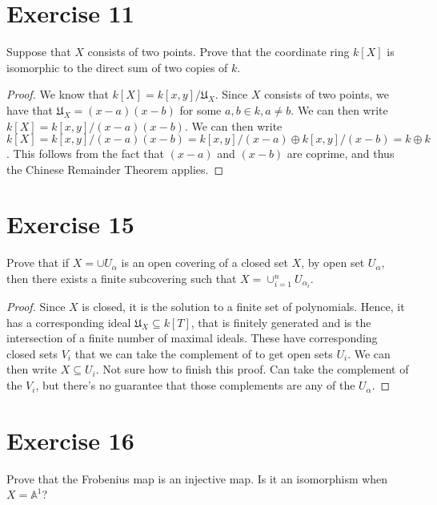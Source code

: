 \documentclass[12pt]{article}
\begin{document}
\section*{Exercise 11}

Suppose that $X$ consists of two points. Prove that the coordinate ring $k[X]$ is isomorphic to the
direct sum of two copies of $k$.

\begin{proof}

  We know that $k[X] = k[x,y] / \mathfrak{U}_X$. Since $X$ consists of two points, we have that
  $\mathfrak{U}_X = (x-a)(x-b)$ for some $a,b \in k, a \neq b$. We can then write $k[X] = k[x,y] / (x-a)(x-b)$.
  We can then write $k[X] = k[x,y] / (x-a)(x-b) = k[x,y] / (x-a) \oplus k[x,y] / (x-b) = k \oplus k$. 
  This follows from the fact that $(x-a)$ and $(x-b)$ are coprime, and thus the Chinese Remainder Theorem applies.

\end{proof}

\section*{Exercise 15}

Prove that if $X = \cup U_\alpha$ is an open covering of a closed set $X$, by open set $U_\alpha$,
then there exists a finite subcovering such that $X = \cup_{i=1}^{n} U_{\alpha_i}$.

\begin{proof}

  Since $X$ is closed, it is the solution to a finite set of polynomials. Hence, it has a
  corresponding ideal $\mathfrak{U}_X \subseteq k[T]$, that is finitely generated and is the
  intersection of a finite number of maximal ideals. These have corresponding closed sets $V_i$ that
  we can take the complement of to get open sets $U_i$. We can then write $X \subseteq U_i$. Not
  sure how to finish this proof. Can take the complement of the $V_i$, but there's no guarantee that
  those complements are any of the $U_\alpha$. 

\end{proof}


\section*{Exercise 16}

Prove that the Frobenius map is an injective map. Is it an isomorphism when $ X = \mathbb{A}^1$?
\end{document}
